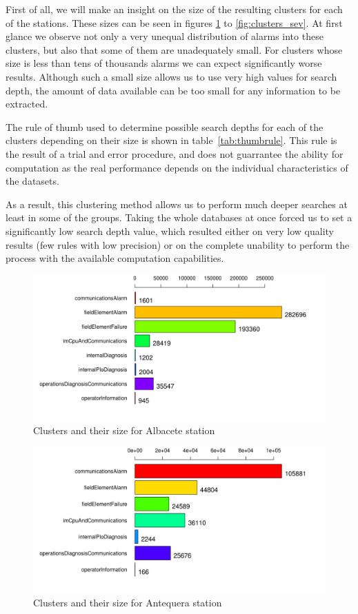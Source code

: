 \documentclass[a4paper,12pt]{article}
\begin{document}
First of all, we will make an insight on the size of the resulting clusters for each of the stations. These sizes can be seen in figures \ref{fig:clusters_alb} to \ref{fig:clusters_sev}. At first glance we observe not only a very unequal distribution of alarms into these clusters, but also that some of them are unadequately small. For clusters whose size is less than tens of thousands alarms we can expect significantly worse results. Although such a small size allows us to use very high values for search depth, the amount of data available can be too small for any information to be extracted.

The rule of thumb used to determine possible search depths for each of the clusters depending on their size is shown in table~\ref{tab:thumbrule}. This rule is the result of a trial and error procedure, and does not guarrantee the ability for computation as the real performance depends on the individual characteristics of the datasets.

As a result, this clustering method allows us to perform much deeper searches at least in some of the groups. Taking the whole databases at once forced us to set a significantly low search depth value, which resulted either on very low quality results (few rules with low precision) or on the complete unability to perform the process with the available computation capabilities.

\begin{figure}[hbtp]
\includegraphics[width=\textwidth]{img/clusters_alb.png}
\caption{Clusters and their size for Albacete station} \label{fig:clusters_alb}
\end{figure}

\begin{figure}[hbtp]
\includegraphics[width=\textwidth]{img/clusters_ant.png}
\caption{Clusters and their size for Antequera station} \label{fig:clusters_ant}
\end{figure}
\end{document}
